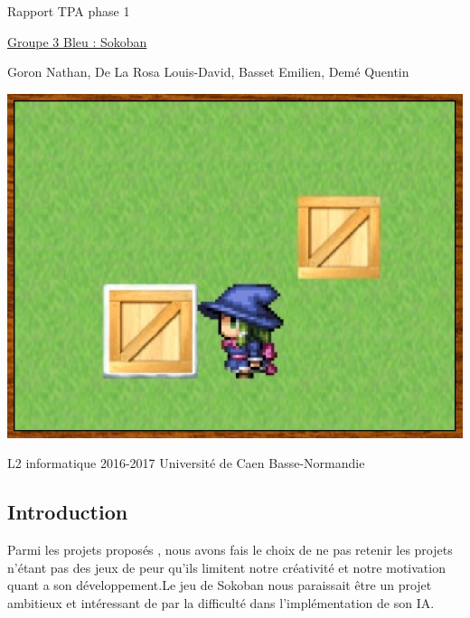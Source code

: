\documentclass{article}
\begin{document}
\begin{titlepage}
\begin{center}
\Huge Rapport TPA phase 1

\normalsize
\vspace{0.5cm}
\Large {\underline{ Groupe 3 Bleu : Sokoban} }

\vspace{1cm}

\normalsize
Goron Nathan, De La Rosa Louis-David, Basset Emilien, Demé Quentin

\vspace{1cm}
\begin{center}
\includegraphics[scale=0.7]{../Screenshots/main.jpg}
\end{center}
\vspace{3.5cm}
L2 informatique 2016-2017 Université de Caen Basse-Normandie
\end{center}
\end{titlepage}


\newpage
\tableofcontents

\newpage
\begin{center}
	\section{Introduction}
\end{center}
\vspace{1cm}
	Parmi les projets proposés , nous avons fais le choix de ne pas retenir les projets n'étant pas des jeux de peur qu'ils limitent notre créativité et notre motivation quant a son développement.Le jeu de Sokoban nous paraissait être un projet ambitieux et intéressant de par la difficulté dans l'implémentation de son IA.
 \vspace{0.5cm}
\end{document}
